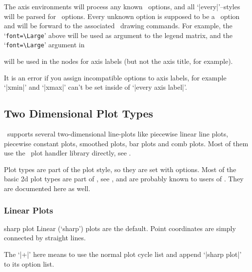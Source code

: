 The axis environments will process any known \PGFPlots\ options, and all `|every|'--styles will be parsed for \PGFPlots\ options. Every unknown option is supposed to be a \Tikz\ option and will be forward to the associated \Tikz\ drawing commands. For example, the `\lstinline{font=\Large}' above will be used as argument to the legend matrix, and the `\lstinline{font=\Large}' argument in 
\begin{codeexample}
\end{codeexample}
will be used in the nodes for axis labels (but not the axis title, for example).

It is an error if you assign incompatible options to axis labels, for example `|xmin|' and `|xmax|' can't be set inside of `|every axis label|'.

\subsection{Two Dimensional Plot Types}
\PGFPlots\ supports several two-dimensional line-plots like piecewise linear line plots, piecewise constant plots, smoothed plots, bar plots and comb plots. Most of them use the \PGF\ plot handler library directly, see \cite[section 18.8]{tikz}.

Plot types are part of the plot style, so they are set with options. Most of the basic 2d plot types are part of \Tikz, see \cite[section 18.8]{tikz}, and are probably known to users of \Tikz. They are documented here as well.


\subsubsection{Linear Plots}
\begin{plottype}{sharp plot}
Linear (`sharp') plots are the default. Point coordinates are simply connected by straight lines. 
\begin{codeexample}[]
\end{codeexample}

The `|+|' here means to use the normal plot cycle list and append `|sharp plot|' to its option list.
\end{plottype}

